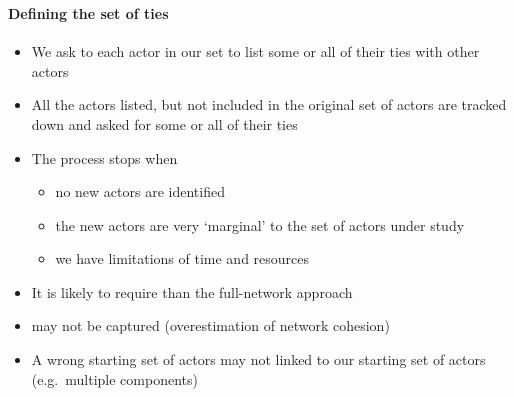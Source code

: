 \documentclass[8pt]{beamer}
\begin{document}


\begin{frame}
\frametitle{\insertsection}
\framesubtitle{Defining the set of ties}

{\color{blue}{Snowball method}}
\begin{itemize}
\item We ask to each actor in our set to list some or all of their ties with other actors
\item All the actors listed, but not included in the original set of actors are tracked down and asked for some or all of their ties
\item The process stops when
	\begin{itemize} 
	\item no new actors are identified
	\item the new actors are very `marginal' to the set of actors under study
	\item we have limitations of time and resources
	\end{itemize}
\item It is likely to require {\color{dkgreen}{less time and resources}} than the full-network approach	
\item {\color{red}{Isolated actors}} may not be captured (overestimation of network cohesion)
\item A wrong starting set of actors may {\color{red}{miss entire sub-sets of actors}} not linked to our starting set of actors (e.g.\ multiple components)
\end{itemize}
\end{frame}

\end{document}
